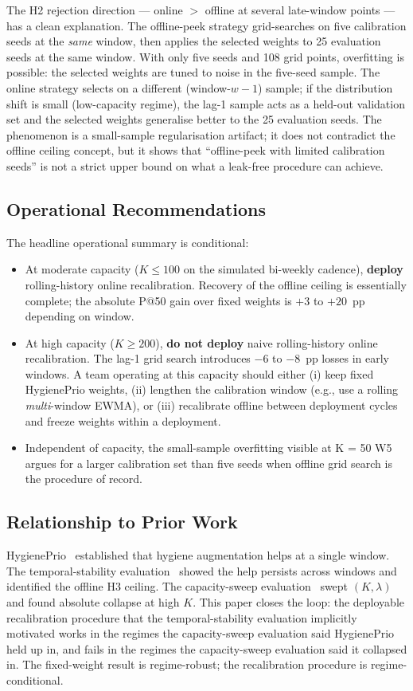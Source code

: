 The H2 rejection direction --- online $>$ offline at several late-window
points --- has a clean explanation. The offline-peek strategy grid-searches
on five calibration seeds at the \textit{same} window, then applies the
selected weights to 25 evaluation seeds at the same window. With only
five seeds and 108 grid points, overfitting is possible: the selected
weights are tuned to noise in the five-seed sample. The online strategy
selects on a different (window-$w-1$) sample; if the distribution shift
is small (low-capacity regime), the lag-1 sample acts as a held-out
validation set and the selected weights generalise better to the 25
evaluation seeds. The phenomenon is a small-sample regularisation
artifact; it does not contradict the offline ceiling concept, but it
shows that ``offline-peek with limited calibration seeds'' is not a
strict upper bound on what a leak-free procedure can achieve.

\subsection{Operational Recommendations}

The headline operational summary is conditional:
\begin{itemize}
\item At moderate capacity ($K \leq 100$ on the simulated bi-weekly
cadence), \textbf{deploy} rolling-history online recalibration. Recovery
of the offline ceiling is essentially complete; the absolute P@50 gain
over fixed weights is $+3$ to $+20$~pp depending on window.
\item At high capacity ($K \geq 200$), \textbf{do not deploy} naive
rolling-history online recalibration. The lag-1 grid search introduces
$-6$ to $-8$~pp losses in early windows. A team operating at this
capacity should either (i) keep fixed HygienePrio weights, (ii) lengthen
the calibration window (e.g., use a rolling \textit{multi}-window
EWMA), or (iii) recalibrate offline between deployment cycles and
freeze weights within a deployment.
\item Independent of capacity, the small-sample overfitting visible
at K = 50 W5 argues for a larger calibration set than five seeds
when offline grid search is the procedure of record.
\end{itemize}

\subsection{Relationship to Prior Work}

HygienePrio~\cite{paper4hygieneprio} established that hygiene augmentation
helps at a single window. The temporal-stability evaluation~\cite{paper5temporal} showed the
help persists across windows and identified the offline H3 ceiling.
The capacity-sweep evaluation~\cite{paper6capacity} swept $(K, \lambda)$ and found
absolute collapse at high $K$. This paper closes the loop: the
deployable recalibration procedure that the temporal-stability evaluation implicitly motivated
works in the regimes the capacity-sweep evaluation said HygienePrio held up in, and fails
in the regimes the capacity-sweep evaluation said it collapsed in. The fixed-weight result
is regime-robust; the recalibration procedure is regime-conditional.
